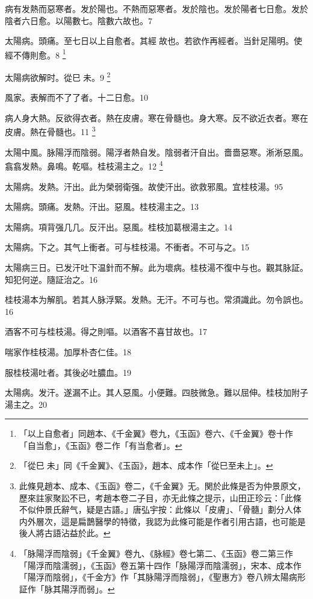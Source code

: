 病有发熱而惡寒者。发於陽也。不熱而惡寒者。发於陰也。发於陽者七日愈。发於陰者六日愈。以陽數七。陰數六故也。7

太陽病。頭痛。至七日以上自愈者。其經{\sungtpii 𥁞}故也。若欲作再經者。当針足陽明。使經不傳則愈。8
	\footnote{
		「以上自愈者」同趙本、《千金翼》卷九，《玉函》卷六、《千金翼》卷十作「自当愈」，《玉函》卷二作「有当愈者」。
	}

太陽病欲解时。從巳{\sungtpii 𥁞}未。9
	\footnote{
		「從巳{\sungtpii 𥁞}未」同《千金翼》、《玉函》，趙本、成本作「從巳至未上」。
	}

風家。表解而不了了者。十二日愈。10

病人身大熱。反欲得衣者。熱在皮膚。寒在骨髓也。身大寒。反不欲近衣者。寒在皮膚。熱在骨髓也。11
	\footnote{
		此條見趙本、成本、《玉函》卷二，《千金翼》无。関於此條是否为仲景原文，歷來註家聚訟不已，考趙本卷二子目，亦无此條之提示，山田正珍云：「此條不似仲景氏辭气，疑是古語。」唐弘宇按：此條以「皮膚」、「骨髓」劃分人体内外層次，這是扁鵲醫學的特徵，我認为此條可能是作者引用古語，也可能是後人將古語沾益於此。
	}

太陽中風。{\khaaitp 脉}陽浮而陰弱。陽浮者熱自发。陰弱者汗自出。嗇嗇惡寒。淅淅惡風。翕翕发熱。鼻鳴。乾嘔。桂枝湯主之。12
	\footnote{
		「脉陽浮而陰弱」《千金翼》卷九、《脉經》卷七第二、《玉函》卷二第三作「陽浮而陰濡弱」，《玉函》卷五第十四作「脉陽浮而陰濡弱」，宋本、成本作「陽浮而陰弱」，《千金方》作「其脉陽浮而陰弱」，《聖惠方》卷八辨太陽病形証作「脉其陽浮而弱」。
	}

太陽病。发熱。汗出。此为榮弱衛强。故使汗出。欲救邪風。宜桂枝湯。95

太陽病。頭痛。发熱。汗出。惡風。桂枝湯主之。13

太陽病。項背强几几。反汗出。惡風。桂枝{\khaaitp 加葛根}湯主之。14

太陽病。下之。其气上衝者。可与桂枝湯。不衝者。不可与之。15

太陽病三日。已发汗吐下温針而不解。此为壞病。桂枝湯不復中与也。觀其脉証。知犯何逆。隨証治之。16

桂枝湯本为解肌。若其人脉浮緊。发熱。无汗。不可与也。常須識此。勿令誤也。16

酒客不可与桂枝湯。得之則嘔。以酒客不喜甘故也。17

喘家作桂枝湯。加厚朴杏仁佳。18

服桂枝湯吐者。其後必吐膿血。19

太陽病。发汗。遂漏不止。其人惡風。小便難。四肢微急。難以屈伸。桂枝加附子湯主之。20

